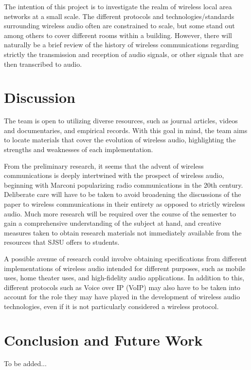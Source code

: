 \documentclass[conference]{IEEEtran}
\begin{document}
The intention of this project is to investigate the realm of wireless local area
networks at a small scale. The different protocols and technologies/standards
surrounding wireless audio often are constrained to scale, but some stand out
among others to cover different rooms within a building. However, there will
naturally be a brief review of the history of wireless communications regarding
strictly the transmission and reception of audio signals, or other signals that
are then transcribed to audio.


\section*{Discussion}

The team is open to utilizing diverse resources, such as journal articles, videos and 
documentaries, and empirical records. With this goal in mind, the team aims to locate 
materials that cover the evolution of wireless audio, highlighting the strengths and 
weaknesses of each implementation.

From the preliminary research, it seems that the advent of wireless communications is 
deeply intertwined with the prospect of wireless audio, beginning with Marconi 
popularizing radio communications in the 20th century.\cite{bhalla_unraveling_2021} Deliberate care will have 
to be taken to avoid broadening the discussions of the paper to wireless 
communications in their entirety as opposed to strictly wireless audio. Much more 
research will be required over the course of the semester to gain a comprehensive 
understanding of the subject at hand, and creative measures taken to obtain research 
materials not immediately available from the resources that SJSU offers to students.

A possible avenue of research could involve obtaining specifications from different 
implementations of wireless audio intended for different purposes, such as mobile 
uses, home theater uses, and high-fidelity audio applications. In addition to this, 
different protocols such as Voice over IP (VoIP) may also have to be taken into 
account for the role they may have played in the development of wireless audio 
technologies, even if it is not particularly considered a wireless protocol.

\section*{Conclusion and Future Work}

To be added...




\vspace{12pt}
\end{document}
